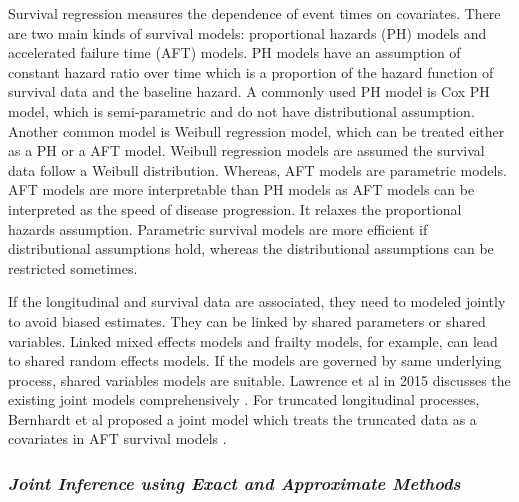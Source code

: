 Survival regression measures the dependence of event times on covariates. There are two main kinds of survival models: proportional hazards (PH) models and accelerated failure time (AFT) models. PH models have an assumption of constant hazard ratio over time which is a proportion of the hazard function of survival data and the baseline hazard. A commonly used PH model is Cox PH model, which is semi-parametric and do not have distributional assumption. Another common model is Weibull regression model, which can be treated either as a PH or a AFT model. Weibull regression models are assumed the survival data follow a Weibull distribution. Whereas, AFT models are parametric models. AFT models are more interpretable than PH models as AFT models can be interpreted as the speed of disease progression. It relaxes the proportional hazards assumption. 
Parametric survival models are more efficient if distributional assumptions hold, whereas the distributional assumptions can be restricted sometimes. %


If the longitudinal and survival data are associated, they need to modeled jointly to avoid biased estimates. They can be linked by shared parameters or shared variables. Linked mixed effects models and frailty models, for example, can lead to shared random effects models. If the models are governed by same underlying process, shared variables models are suitable.
Lawrence et al in 2015 discusses the existing joint models comprehensively \cite{lawrence2015joint}. For truncated longitudinal processes, Bernhardt et al \cite{bernhardt2014flexible} proposed a joint model which treats the truncated data as a covariates in AFT survival models \cite{bernhardt2014flexible}.





\subsubsection*{\textit{Joint Inference using Exact and Approximate Methods}}


